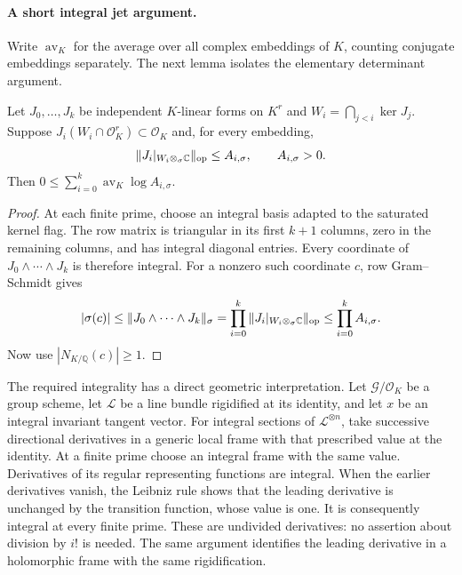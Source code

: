 \paragraph{A short integral jet argument.}
Write $\operatorname{av}_K$ for the average over all complex embeddings
of $K$, counting conjugate embeddings separately. The next lemma
isolates the elementary determinant argument.

\begin{lemma}\label{geo-leading-jet-determinant}
Let $J_0,\ldots,J_k$ be independent $K$-linear forms on $K^r$ and
$W_i=\bigcap_{j<i}\ker J_j$. Suppose
$J_i(W_i\cap\mathcal O_K^r)\subset\mathcal O_K$ and, for every embedding,
\[
 \|J_i|_{W_i\otimes_\sigma\mathbb C}\|_{\rm op}\le A_{i,\sigma},
 \qquad A_{i,\sigma}>0 .
\]
Then $0\le\sum_{i=0}^k\operatorname{av}_K\log A_{i,\sigma}$.
\end{lemma}
\begin{proof}
At each finite prime, choose an integral basis adapted to the saturated
kernel flag. The row matrix is triangular in its first $k+1$ columns,
zero in the remaining columns, and has integral diagonal entries.
Every coordinate of $J_0\wedge\cdots\wedge J_k$ is therefore integral.
For a nonzero such coordinate $c$, row Gram--Schmidt gives
\[
 |\sigma(c)|\le\|J_0\wedge\cdots\wedge J_k\|_\sigma
       =\prod_{i=0}^k\|J_i|_{W_i\otimes_\sigma\mathbb C}\|_{\rm op}
       \le\prod_{i=0}^kA_{i,\sigma}.
\]
Now use $|N_{K/\mathbb Q}(c)|\ge1$.
\end{proof}

The required integrality has a direct geometric interpretation.
Let $\mathcal G/\mathcal O_K$ be a group scheme, let $\mathcal L$
be a line bundle rigidified at its identity, and let $x$ be an integral
invariant tangent vector. For integral sections of $\mathcal L^{\otimes n}$,
take successive directional derivatives in a generic local frame
with that prescribed value at the identity. At a finite prime choose
an integral frame with the same value. Derivatives of its regular
representing functions are integral. When the earlier derivatives
vanish, the Leibniz rule shows that the leading derivative is unchanged
by the transition function, whose value is one. It is consequently
integral at every finite prime. These are undivided derivatives:
no assertion about division by $i!$ is needed. The same argument
identifies the leading derivative in a holomorphic frame with the
same rigidification.

